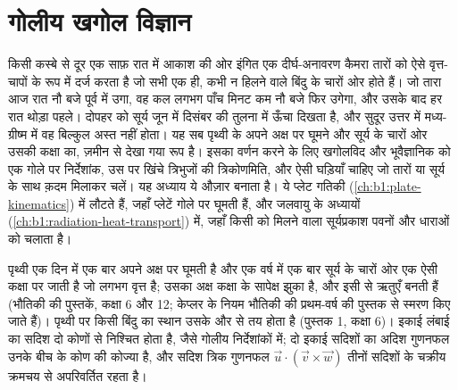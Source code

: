 \chapter{गोलीय खगोल विज्ञान}\label{ch:b1:spherical-astronomy}

किसी कस्बे से दूर एक साफ़ रात में आकाश की ओर इंगित एक दीर्घ-अनावरण कैमरा तारों को
ऐसे वृत्त-चापों के रूप में दर्ज करता है जो सभी एक ही, कभी न हिलने वाले बिंदु के
चारों ओर होते हैं। जो तारा आज रात नौ बजे पूर्व में उगा, वह कल लगभग पाँच मिनट कम नौ
बजे फिर उगेगा, और उसके बाद हर रात थोड़ा पहले। दोपहर को सूर्य जून में दिसंबर की
तुलना में ऊँचा दिखता है, और सुदूर उत्तर में मध्य-ग्रीष्म में वह बिल्कुल अस्त नहीं होता।
यह सब पृथ्वी के अपने अक्ष पर घूमने और सूर्य के चारों ओर उसकी कक्षा का, ज़मीन से
देखा गया रूप है। इसका वर्णन करने के लिए खगोलविद और भूवैज्ञानिक को एक गोले पर
निर्देशांक, उस पर खिंचे त्रिभुजों की त्रिकोणमिति, और ऐसी घड़ियाँ चाहिए जो तारों या सूर्य
के साथ क़दम मिलाकर चलें। यह अध्याय ये औज़ार बनाता है। ये प्लेट गतिकी
(\cref{ch:b1:plate-kinematics}) में लौटते हैं, जहाँ प्लेटें गोले पर घूमती हैं, और जलवायु के
अध्यायों (\cref{ch:b1:radiation-heat-transport}) में, जहाँ किसी  को मिलने वाला
सूर्यप्रकाश पवनों और धाराओं को चलाता है।

\begin{recall}
पृथ्वी एक दिन में एक बार अपने अक्ष पर घूमती है और एक वर्ष में एक बार सूर्य के चारों ओर
एक ऐसी कक्षा पर जाती है जो लगभग वृत्त है; उसका अक्ष कक्षा के सापेक्ष झुका है, और इसी
से ऋतुएँ बनती हैं (भौतिकी की पुस्तकें, कक्षा 6 और 12; केप्लर के नियम भौतिकी की
प्रथम-वर्ष की पुस्तक से स्मरण किए जाते हैं)। पृथ्वी पर किसी बिंदु का स्थान उसके  और
 से तय होता है (पुस्तक 1, कक्षा 6)। इकाई लंबाई का सदिश दो कोणों से निश्चित होता है,
जैसे गोलीय निर्देशांकों में; दो इकाई सदिशों का अदिश गुणनफल उनके बीच के कोण की कोज्या है,
और सदिश त्रिक गुणनफल $\vec u\cdot(\vec v\times\vec w)$ तीनों सदिशों के चक्रीय क्रमचय से
अपरिवर्तित रहता है।
\end{recall}

